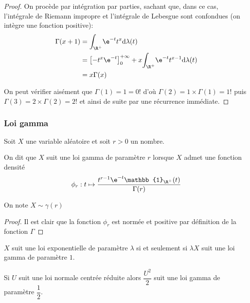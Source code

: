 \begin{proof}
On procède par intégration par parties, sachant que, dans ce cas, l'intégrale de Riemann impropre et l'intégrale de Lebesgue sont confondues (on intègre une fonction positive):
\begin{align*}
\Gamma(x+1) & = \displaystyle{\int_{\R^+}} \e^{-t} t^{x} \mathrm d \lambda(t) \\
 & = \left[-t^x\e^{-t}\right]_0^{+\infty} + x \displaystyle{\int_{\R^+}} \e^{-t}t^{x-1} \mathrm d \lambda(t) \\
 & = x \Gamma(x)
\end{align*}

On peut vérifier aisément que $\Gamma(1) = 1 = 0!$ d'où $\Gamma(2)=1 \times \Gamma(1)=1!$ puis $\Gamma(3)=2 \times \Gamma(2) = 2!$ et ainsi de suite par une récurrence immédiate.
\end{proof}

\subsubsection{Loi gamma}

\begin{de}
Soit $X$ une variable aléatoire et soit $r>0$ un nombre.

On dit que $X$ suit une loi gamma de paramètre $r$ lorsque $X$ admet une fonction densité \[\phi_r: t \mapsto \dfrac{t^{r-1}\e^{-t} \mathbb{1}_{\R^+}(t)}{\Gamma(r)}\]

On note $X \sim \gamma(r)$
\end{de}

\begin{proof}
Il est clair que la fonction $\phi_r$ est normée et positive par définition de la fonction $\Gamma$
\end{proof}

\begin{prop}
$X$ suit une loi exponentielle de paramètre $\lambda$ si et seulement si $\lambda X$ suit une loi gamma de paramètre $1$.

Si $U$ suit une loi normale centrée réduite alors $\dfrac{U^2}{2}$ suit une loi gamma de paramètre $\dfrac{1}{2}$.
\end{prop}


